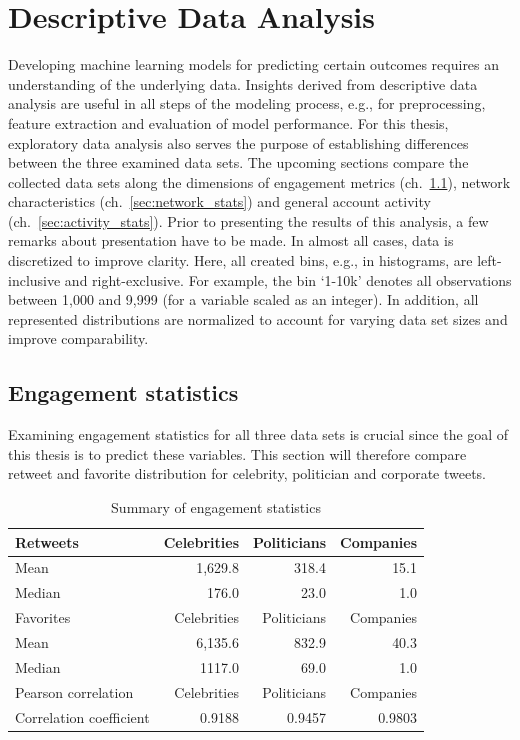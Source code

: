 \section{Descriptive Data Analysis}
\label{sec:dda}

Developing machine learning models for predicting certain outcomes requires
an understanding of the underlying data.
Insights derived from descriptive data analysis are useful in all steps of the
modeling process, e.g., for preprocessing, feature extraction and evaluation
of model performance.
For this thesis, exploratory data analysis also serves the purpose of establishing
differences between the three examined data sets.
The upcoming sections compare the collected data sets along the dimensions of
engagement metrics (ch.~\ref{sec:engagement_stats}), network characteristics
(ch.~\ref{sec:network_stats}) and general account activity (ch.~\ref{sec:activity_stats}).
Prior to presenting the results of this analysis, a few remarks about presentation
have to be made.
In almost all cases, data is discretized to improve clarity.
Here, all created bins, e.g., in histograms, are left-inclusive and right-exclusive.
For example, the bin `1-10k' denotes all observations between 1,000 and
9,999 (for a variable scaled as an integer).
In addition, all represented distributions are normalized to account for varying
data set sizes and improve comparability.

\subsection{Engagement statistics}
\label{sec:engagement_stats}

Examining engagement statistics for all three data sets is crucial since the goal
of this thesis is to predict these variables.
This section will therefore compare retweet and favorite distribution for 
celebrity, politician and corporate tweets.

\begin{table}
\centering
\begin{tabular}{lrrr}
\toprule
Retweets & Celebrities & Politicians & Companies \\
\midrule
Mean & 1,629.8 & 318.4 & 15.1 \\
Median & 176.0 & 23.0 & 1.0 \\
\midrule
Favorites & Celebrities & Politicians & Companies \\
\midrule
Mean & 6,135.6 & 832.9 & 40.3 \\
Median & 1117.0 & 69.0 & 1.0 \\
\midrule
Pearson correlation & Celebrities & Politicians & Companies \\
\midrule
Correlation coefficient & 0.9188 & 0.9457 & 0.9803 \\
\bottomrule
\end{tabular}
\caption{Summary of engagement statistics}
\label{tab:engagement_summary}
\end{table}

